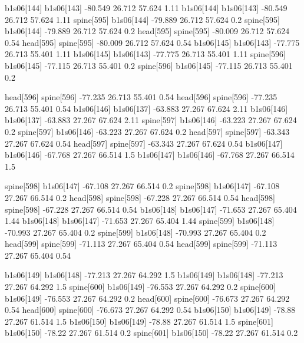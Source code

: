 b1s06[144]    b1s06[143]    -80.549    26.712    57.624    1.11
b1s06[144]    b1s06[143]    -80.549    26.712    57.624    1.11
spine[595]    b1s06[144]    -79.889    26.712    57.624    0.2
spine[595]    b1s06[144]    -79.889    26.712    57.624    0.2
head[595]    spine[595]    -80.009    26.712    57.624    0.54
head[595]    spine[595]    -80.009    26.712    57.624    0.54
b1s06[145]    b1s06[143]    -77.775    26.713    55.401    1.11
b1s06[145]    b1s06[143]    -77.775    26.713    55.401    1.11
spine[596]    b1s06[145]    -77.115    26.713    55.401    0.2
spine[596]    b1s06[145]    -77.115    26.713    55.401    0.2


head[596]    spine[596]    -77.235    26.713    55.401    0.54
head[596]    spine[596]    -77.235    26.713    55.401    0.54
b1s06[146]    b1s06[137]    -63.883    27.267    67.624    2.11
b1s06[146]    b1s06[137]    -63.883    27.267    67.624    2.11
spine[597]    b1s06[146]    -63.223    27.267    67.624    0.2
spine[597]    b1s06[146]    -63.223    27.267    67.624    0.2
head[597]    spine[597]    -63.343    27.267    67.624    0.54
head[597]    spine[597]    -63.343    27.267    67.624    0.54
b1s06[147]    b1s06[146]    -67.768    27.267    66.514    1.5
b1s06[147]    b1s06[146]    -67.768    27.267    66.514    1.5


spine[598]    b1s06[147]    -67.108    27.267    66.514    0.2
spine[598]    b1s06[147]    -67.108    27.267    66.514    0.2
head[598]    spine[598]    -67.228    27.267    66.514    0.54
head[598]    spine[598]    -67.228    27.267    66.514    0.54
b1s06[148]    b1s06[147]    -71.653    27.267    65.404    1.44
b1s06[148]    b1s06[147]    -71.653    27.267    65.404    1.44
spine[599]    b1s06[148]    -70.993    27.267    65.404    0.2
spine[599]    b1s06[148]    -70.993    27.267    65.404    0.2
head[599]    spine[599]    -71.113    27.267    65.404    0.54
head[599]    spine[599]    -71.113    27.267    65.404    0.54


b1s06[149]    b1s06[148]    -77.213    27.267    64.292    1.5
b1s06[149]    b1s06[148]    -77.213    27.267    64.292    1.5
spine[600]    b1s06[149]    -76.553    27.267    64.292    0.2
spine[600]    b1s06[149]    -76.553    27.267    64.292    0.2
head[600]    spine[600]    -76.673    27.267    64.292    0.54
head[600]    spine[600]    -76.673    27.267    64.292    0.54
b1s06[150]    b1s06[149]    -78.88    27.267    61.514    1.5
b1s06[150]    b1s06[149]    -78.88    27.267    61.514    1.5
spine[601]    b1s06[150]    -78.22    27.267    61.514    0.2
spine[601]    b1s06[150]    -78.22    27.267    61.514    0.2


